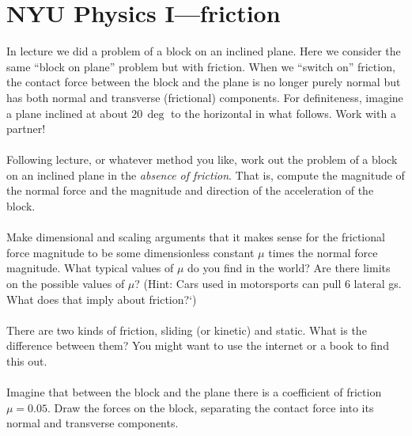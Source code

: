 \documentclass[12pt]{article}
\begin{document}
\section*{NYU Physics I---friction}

In lecture we did a problem of a block on an inclined plane.
Here we consider the same ``block on plane'' problem but with
friction.  When we ``switch on'' friction, the contact force between
the block and the plane is no longer purely normal but has both normal
and transverse (frictional) components.  For definiteness, imagine a
plane inclined at about $20\,\deg$ to the horizontal in what
follows. Work with a partner!

\paragraph{\theproblem}%
Following lecture, or whatever method you like, work out the problem
of a block on an inclined plane in the \emph{absence of friction}.
That is, compute the magnitude of the normal force and the magnitude
and direction of the acceleration of the block.

\paragraph{\theproblem}%
Make dimensional and scaling arguments that it makes sense for the
frictional force magnitude to be some dimensionless constant $\mu$
times the normal force magnitude. What typical values of $\mu$ do you
find in the world? Are there limits on the possible values of $\mu$?
(Hint: Cars used in motorsports can pull 6 lateral gs. What does that
imply about friction?`)

\paragraph{\theproblem}%
There are two kinds of friction, sliding (or kinetic) and static. What
is the difference between them? You might want to use the internet or
a book to find this out.

\paragraph{\theproblem}%
Imagine that between the block and the plane there is a coefficient of
friction $\mu=0.05$.  Draw the forces on the block, separating the
contact force into its normal and transverse components.
\end{document}
